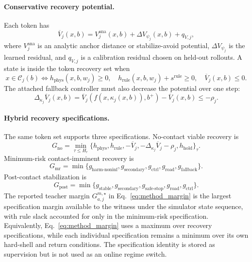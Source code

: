 \documentclass[conference]{IEEEtran}
\begin{document}
\paragraph{Conservative recovery potential.}
Each token has
\begin{equation}
\label{eq:app_recovery_potential_new}
    \overline V_j(x,b)=V_j^{\mathrm{ana}}(x,b)+\Delta V_{\psi_j}(x,b)+q_{V,j},
\end{equation}
where $V_j^{\mathrm{ana}}$ is an analytic anchor distance or stabilize-avoid potential, $\Delta V_{\psi_j}$ is the learned residual, and $q_{V,j}$ is a calibration residual chosen on held-out rollouts.  A state is inside the token recovery set when
\begin{equation}
\label{eq:app_token_set_new}
    x\in\mathcal C_j(b)\iff
    h_{\mathrm{phys}}(x,b,w_j)\ge0,
    \quad h_{\mathrm{rule}}(x,b,w_j)+s^{\mathrm{rule}}\ge0,
    \quad \overline V_j(x,b)\le0.
\end{equation}
The attached fallback controller must also decrease the potential over one step:
\begin{equation}
\label{eq:app_decrease_new}
    \Delta_{\kappa_j}\overline V_j(x,b)=
    \overline V_j(f(x,\kappa_j(x,b)),b^+)-\overline V_j(x,b)\le-\rho_j.
\end{equation}

\paragraph{Hybrid recovery specifications.}
The same token set supports three specifications.  No-contact viable recovery is
\begin{equation}
\label{eq:app_g_no_new}
    G_{\mathrm{no}}=\min_{\tau\le H_r}\{h_{\mathrm{phys}},h_{\mathrm{rule}},-\overline V_j, -\Delta_{\kappa_j}\overline V_j-\rho_j,h_{\mathrm{hold}}\}_{\tau}.
\end{equation}
Minimum-risk contact-imminent recovery is
\begin{equation}
\label{eq:app_g_mr_new}
    G_{\mathrm{mr}}=\min\{g_{\mathrm{harm\text{-}noninf}},g_{\mathrm{secondary}},g_{\mathrm{ctrl}},g_{\mathrm{road}},g_{\mathrm{fallback}}\}.
\end{equation}
Post-contact stabilization is
\begin{equation}
\label{eq:app_g_post_new}
    G_{\mathrm{post}}=\min\{g_{\mathrm{stable}},g_{\mathrm{secondary}},g_{\mathrm{safe\text{-}stop}},g_{\mathrm{road}},g_{\mathrm{ctrl}}\}.
\end{equation}
The reported teacher margin $G_{a,j}^{m,\star}$ in Eq.~\eqref{eq:method_margin} is the largest specification margin available to the witness under the simulator state sequence, with rule slack accounted for only in the minimum-risk specification.  Equivalently, Eq.~\eqref{eq:method_margin} uses a maximum over recovery specifications, while each individual specification remains a minimum over its own hard-shell and return conditions.  The specification identity is stored as supervision but is not used as an online regime switch.
\end{document}
